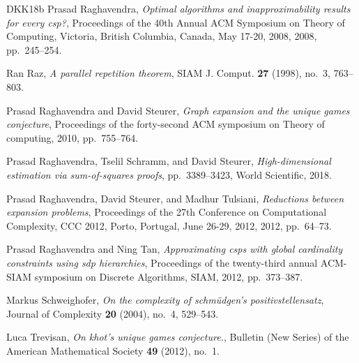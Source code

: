 \documentclass[11pt]{article}
\theoremstyle{definition}
\begin{document}
\begin{thebibliography}{DKK{\etalchar{+}}18b}
Prasad Raghavendra, \emph{Optimal algorithms and inapproximability results for
  every csp?}, Proceedings of the 40th Annual {ACM} Symposium on Theory of
  Computing, Victoria, British Columbia, Canada, May 17-20, 2008, 2008,
  pp.~245--254.

Ran Raz, \emph{A parallel repetition theorem}, {SIAM} J. Comput. \textbf{27}
  (1998), no.~3, 763--803.

Prasad Raghavendra and David Steurer, \emph{Graph expansion and the unique
  games conjecture}, Proceedings of the forty-second ACM symposium on Theory of
  computing, 2010, pp.~755--764.

Prasad Raghavendra, Tselil Schramm, and David Steurer, \emph{High-dimensional
  estimation via sum-of-squares proofs}, pp.~3389--3423, World Scientific,
  2018.

Prasad Raghavendra, David Steurer, and Madhur Tulsiani, \emph{Reductions
  between expansion problems}, Proceedings of the 27th Conference on
  Computational Complexity, {CCC} 2012, Porto, Portugal, June 26-29, 2012,
  2012, pp.~64--73.

Prasad Raghavendra and Ning Tan, \emph{Approximating csps with global
  cardinality constraints using sdp hierarchies}, Proceedings of the
  twenty-third annual ACM-SIAM symposium on Discrete Algorithms, SIAM, 2012,
  pp.~373--387.

Markus Schweighofer, \emph{On the complexity of schm{\"u}dgen's
  positivstellensatz}, Journal of Complexity \textbf{20} (2004), no.~4,
  529--543.

Luca Trevisan, \emph{On khot's unique games conjecture.}, Bulletin (New Series)
  of the American Mathematical Society \textbf{49} (2012), no.~1.

\end{thebibliography}
\end{document}
